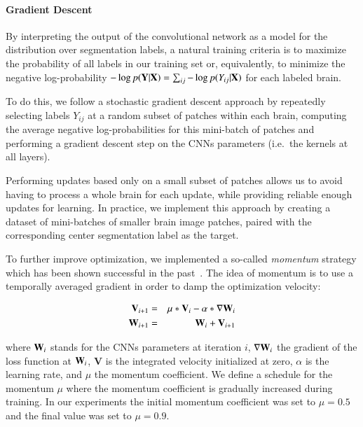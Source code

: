 \documentclass[final,5p,times,twocolumn]{elsarticle}
\newcommand{\MH}[1]{\textcolor{purple}{\small{}[\textbf{Mohammad:} #1]}}
\begin{document}
\paragraph{Gradient Descent}

By interpreting the output of the convolutional network as a model for the distribution over segmentation labels, a natural training criteria is to maximize the probability of all labels in our training set or, equivalently, to minimize the negative log-probability $-\log p({\bf Y}|{\bf X}) = \sum_{ij} -\log p(Y_{ij}|{\bf X})$ for each labeled brain.



To do this, we follow a stochastic gradient descent approach by repeatedly selecting labels $Y_{ij}$ at a random subset of patches within each brain, computing the average negative log-probabilities for this mini-batch of patches and performing a gradient descent step on the CNNs parameters (i.e.\ the kernels at all layers).


Performing updates based only on a small subset of patches allows us to avoid having to process a whole brain for each update, while providing reliable enough updates for learning. In practice, we implement this approach by creating a dataset of mini-batches of smaller brain image patches, paired with the corresponding center segmentation label as the target.

To further improve optimization, we implemented a so-called {\em momentum} strategy which has been shown successful in the past~\citep{Krizhevsky-2012-small}.  The idea of momentum is to use a temporally averaged gradient in order to damp the optimization velocity:%

%
\begin{eqnarray}
{\bf V}_{i+1} & = & \mu * {\bf V}_i - \alpha * \nabla {\bf W}_i \nonumber \\
{\bf W}_{i+1} & = & {\bf W}_{i}+{\bf V}_{i+1} \nonumber
\end{eqnarray}

%

where ${\bf W}_i$ stands for the CNNs parameters at iteration $i$, $ \nabla{\bf W}_i$ the gradient of the loss function at ${\bf W}_i$, {\bf V} is the integrated velocity initialized at zero, $\alpha$ is the learning rate, and $\mu$ the momentum coefficient.  We define a schedule for the  momentum $\mu$ where the momentum coefficient is gradually increased during training. In our experiments the initial momentum coefficient was set to $\mu=0.5$ and the final value was set to $\mu=0.9$.
\end{document}
